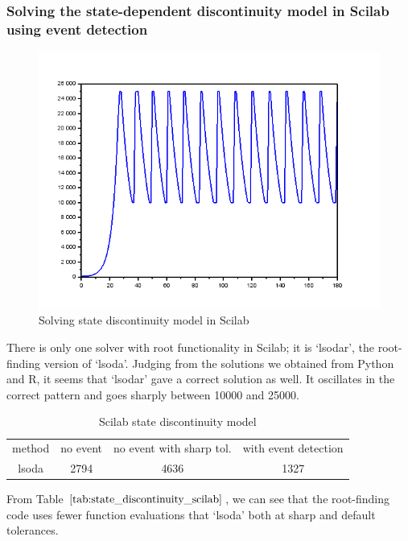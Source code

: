 \subsubsection{Solving the state-dependent discontinuity model in Scilab using event detection}
\begin{figure}[H]
\centering
\includegraphics[width=0.7\linewidth]{./figures/solve_state_discontinuity_scilab}
\caption{Solving state discontinuity model in Scilab}
\label{fig:solve_state_discontinuity_scilab}
\end{figure}
There is only one solver with root functionality in Scilab; it is `lsodar', the root-finding version of `lsoda'. Judging from the solutions we obtained from Python and R, it seems that `lsodar' gave a correct solution as well. It oscillates in the correct pattern and goes sharply between 10000 and 25000.

\begin{table}[h]
\caption {Scilab state discontinuity model} \label{tab:state_discontinuity_scilab}
\begin{center}
\begin{tabular}{ c c c c } 
method & no event & no event with sharp tol. & with event detection \\ 
lsoda & 2794 & 4636 & 1327 \\
\end{tabular}
\end{center}
\end{table}

From Table $\ref{tab:state_discontinuity_scilab}$, we can see that the root-finding code uses fewer function evaluations that `lsoda' both at sharp and default tolerances.

